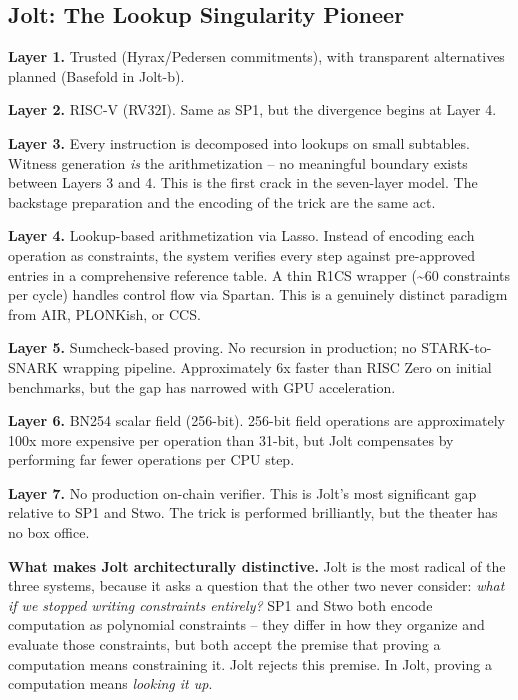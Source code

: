 \documentclass[
  11pt,
  openany]{report}
\renewcommand{\textbf}[1]{{\bfseries\color{MidnightBold}#1}}
\begin{document}
\subsection{Jolt: The Lookup Singularity
Pioneer}\label{jolt-the-lookup-singularity-pioneer}

\textbf{Layer 1.} Trusted (Hyrax/Pedersen commitments), with transparent
alternatives planned (Basefold in Jolt-b).

\textbf{Layer 2.} RISC-V (RV32I). Same as SP1, but the divergence begins at
Layer 4.

\textbf{Layer 3.} Every instruction is decomposed into lookups on small
subtables. Witness generation \emph{is} the arithmetization -- no meaningful
boundary exists between Layers 3 and 4. This is the first crack in the
seven-layer model. The backstage preparation and the encoding of the trick are
the same act.

\textbf{Layer 4.} Lookup-based arithmetization via Lasso. Instead of encoding
each operation as constraints, the system verifies every step against
pre-approved entries in a comprehensive reference table. A thin R1CS wrapper
(\textasciitilde60 constraints per cycle) handles control flow via Spartan. This
is a genuinely distinct paradigm from AIR, PLONKish, or CCS.

\textbf{Layer 5.} Sumcheck-based proving. No recursion in production; no
STARK-to-SNARK wrapping pipeline. Approximately 6x faster than RISC Zero on
initial benchmarks, but the gap has narrowed with GPU acceleration.

\textbf{Layer 6.} BN254 scalar field (256-bit). 256-bit field operations are
approximately 100x more expensive per operation than 31-bit, but Jolt
compensates by performing far fewer operations per CPU step.

\textbf{Layer 7.} No production on-chain verifier. This is Jolt's most
significant gap relative to SP1 and Stwo. The trick is performed brilliantly,
but the theater has no box office.

\textbf{What makes Jolt architecturally distinctive.} Jolt is the most radical
of the three systems, because it asks a question that the other two never
consider: \emph{what if we stopped writing constraints entirely?} SP1 and Stwo
both encode computation as polynomial constraints -- they differ in how they
organize and evaluate those constraints, but both accept the premise that
proving a computation means constraining it. Jolt rejects this premise. In Jolt,
proving a computation means \emph{looking it up}.
\end{document}
